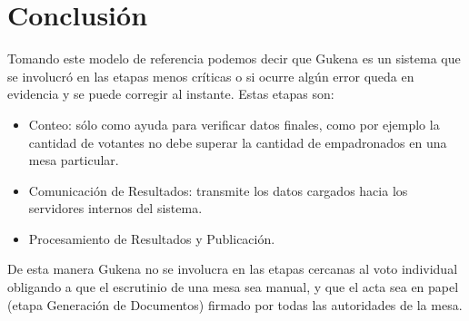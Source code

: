 \section{Conclusión}
Tomando este modelo de referencia podemos decir que Gukena es un sistema que se involucró en las etapas menos críticas o si ocurre algún error queda en evidencia y se puede corregir al instante. Estas etapas son: 
\begin{itemize}
    \item Conteo: sólo como ayuda para verificar datos finales, como por ejemplo la cantidad de votantes no debe superar la cantidad de empadronados en una mesa particular.
    \item Comunicación de Resultados: transmite los datos cargados hacia los servidores internos del sistema.
    \item Procesamiento de Resultados y Publicación.
\end{itemize}
De esta manera Gukena no se involucra en las etapas cercanas al voto individual obligando a que el escrutinio de una mesa sea manual, y que el acta sea en papel (etapa Generación de Documentos) firmado por todas las autoridades de la mesa.
